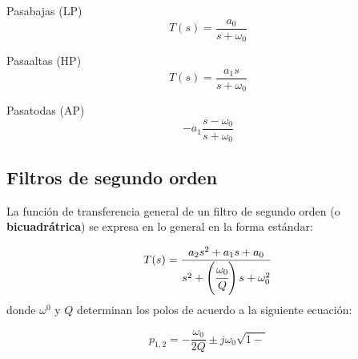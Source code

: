 	Pasabajas (LP)
	\begin{equation}
	T(s) = \frac{a_{0}}{s + \omega_{0}}
	\end{equation}
	
	Pasaaltas (HP)
	\begin{equation}
	T(s) = \frac{a_{1}s}{s + \omega_{0}}
	\end{equation}
	
	Pasatodas (AP)
	\begin{equation}
	-a_{1} \frac{s - \omega_{0}}{s + \omega_{0}}
	\end{equation}
	
	\subsection{Filtros de segundo orden}
	
	La función de transferencia general de un filtro de segundo orden (o \textbf{bicuadrátrica}) se expresa en lo general en la forma estándar:
	
	\begin{equation}
	T(s) = \frac{a_{2} s^{2} + a_{1}s + a_{0}}{s^{2} + \left( \cfrac{ \omega_{0} }{Q} \right)s + \omega_{0}^{2}}
	\end{equation}
	donde $\omega^{0}$ y $Q$ determinan los polos de acuerdo a la siguiente ecuación:
	
	\begin{equation}
	p_{1,2} = - \frac{\omega_{0}}{2 Q} \pm j \omega_{0} \sqrt{1 - }
	\end{equation}
	